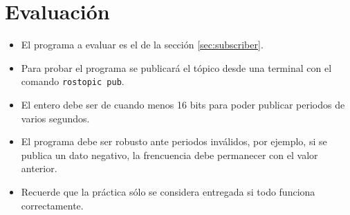 \documentclass[letterpaper,12pt]{article}
\begin{document}
\section{Evaluación}
\begin{itemize}
\item El programa a evaluar es el de la sección \ref{sec:subscriber}.
\item Para probar el programa se publicará el tópico desde una terminal con el comando \texttt{rostopic pub}.
\item El entero debe ser de cuando menos 16 bits para poder publicar periodos de varios segundos.
\item El programa debe ser robusto ante periodos inválidos, por ejemplo, si se publica un dato negativo, la frencuencia debe permanecer con el valor anterior. 
\item Recuerde que la práctica sólo se considera entregada si todo funciona correctamente. 
\end{itemize}
\end{document}
